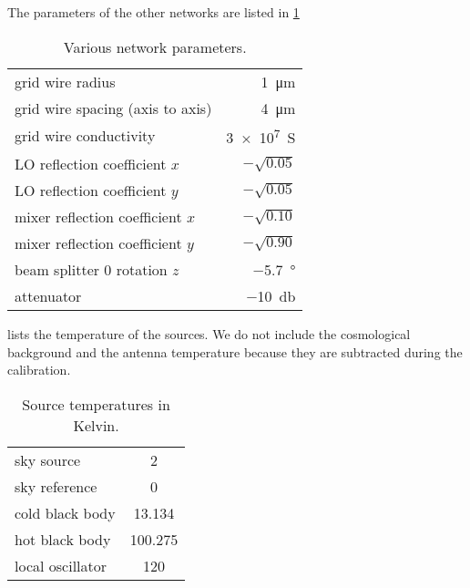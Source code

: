 The parameters of the other networks are listed in \cref{tab:network_parameters}

\begin{table}
    \centering
    \begin{tabular}{lr}
        \toprule
        grid wire radius                 & \SI{1}{\micro\meter} \\
        grid wire spacing (axis to axis) & \SI{4}{\micro\meter} \\
        grid wire conductivity           & \SI{3e7}{\siemens}   \\
        LO reflection coefficient $x$    & $-\sqrt{0.05}$       \\
        LO reflection coefficient $y$    & $-\sqrt{0.05}$       \\
        mixer reflection coefficient $x$ & $-\sqrt{0.10}$       \\
        mixer reflection coefficient $y$ & $-\sqrt{0.90}$       \\
        beam splitter 0 rotation $z$     & \SI{-5.7}{\degree}   \\
        attenuator                       & \SI{-10}{\decibel}   \\
        \bottomrule
    \end{tabular}
    \caption{Various network parameters.}
    \label{tab:network_parameters}
\end{table}

 lists the temperature of the sources.
We do not include the cosmological background and the antenna temperature because they are subtracted during the calibration.
\begin{table}
    \centering
    \begin{tabular}{lS}
        \toprule
        sky source       &   2     \\
        sky reference    &   0     \\
        cold black body  &  13.134 \\
        hot black body   & 100.275 \\
        local oscillator & 120     \\
        \bottomrule
    \end{tabular}
    \caption{Source temperatures in Kelvin.}
    \label{tab:model_temperatures}
\end{table}

